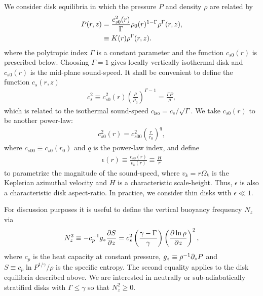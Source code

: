 We consider disk equilibria in which the pressure $P$ and density
$\rho$ are related by   
\begin{align}
  P(r,z) &= 
  \frac{c_{s0}^2(r)}{\Gamma}\rho_0(r)^{1-\Gamma}\rho^\Gamma(r,z),\notag\\
  & \equiv K(r)\rho^{\Gamma}(r,z). \label{eqm_press}
\end{align}
where the polytropic index $\Gamma$ is a  constant parameter  and the
function $c_{s0}(r)$ is prescribed below. Choosing $\Gamma=1$ gives 
locally vertically isothermal disk and $c_{s0}(r)$ is the mid-plane
sound-speed. %
It shall be convenient to define the function $c_s(r,z)$ 
\begin{align}
  c_s^2\equiv %
  c_{s0}^2(r)\left(\frac{\rho}{\rho_0}\right)^{\Gamma-1} =
  \frac{\Gamma P}{\rho}, 
\end{align}
which is related to the isothermal sound-speed $c_\mathrm{iso} =
c_s/\sqrt{\Gamma}$. We take $c_{s0}(r)$ to be another power-law:  
\begin{align}
  c_{s0}^2(r)=c_{s00}^2\left(\frac{r}{r_0}\right)^q, 
\end{align}
where $c_{s00}\equiv c_{s0}(r_0)$  and $q$ is the power-law index, and
define   
\begin{align}
  \epsilon(r) \equiv \frac{c_{s0}(r)}{v_k(r)} \equiv
  \frac{H}{r} 
\end{align}
to parametrize the magnitude of the sound-speed, where
$v_k=r\Omega_k$ is the Keplerian azimuthal velocity and
$H$ is a characteristic scale-height.  Thus, $\epsilon$
is also a characteristic disk aspect-ratio.  In practice, we consider
thin disks with $\epsilon \ll 1$. 

For discussion purposes it is useful to define the vertical buoyancy
frequency $N_z$ via
\begin{align}
  N_z^2 \equiv - c_p^{-1}g_z \frac{\partial S}{\partial z} = c_s^2 \left(\frac{\gamma -
      \Gamma}{\gamma}\right)\left(\frac{\partial\ln\rho}{\partial z}\right)^2,   
\end{align}
where $c_p$ is the heat capacity at constant pressure, $g_z\equiv
\rho^{-1}\partial_zP $ and $S\equiv c_p\ln{P^{1/\gamma}/\rho}$ is the
specific entropy. The second equality applies to the disk equilibria
described above. 
We are interested in
neutrally or sub-adiabatically stratified 
disks with $\Gamma\leq \gamma$ so that $N_z^2\geq0$.  


